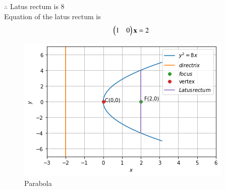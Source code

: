 $\therefore$ Latus rectum is 8\\
Equation of the latus rectum is
\begin{align}
    \begin{pmatrix}1&0\end{pmatrix}\mathbf{x}=2
\end{align}
\begin{figure}[ht]
    \centering
    \includegraphics[width=\columnwidth]{solutions/oct/2/24/Graph.png}
    \caption{Parabola}
    \label{oct/2/24/Graphical solution}
\end{figure}
